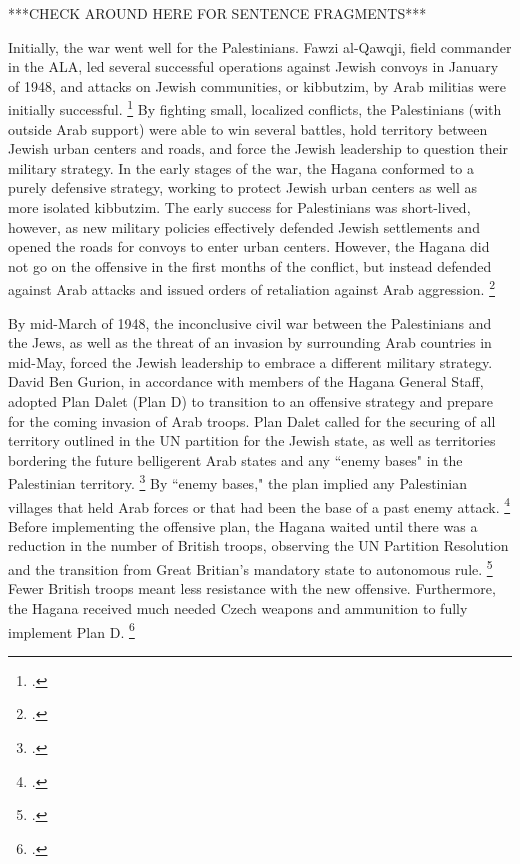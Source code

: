 \documentclass[12pt]{turabian-researchpaper}
\begin{document}
***CHECK AROUND HERE FOR SENTENCE FRAGMENTS***

Initially, the war went well for the Palestinians.  Fawzi al-Qawqji, field commander in the ALA, led several successful operations against Jewish convoys in January of 1948, and attacks on Jewish communities, or kibbutzim, by Arab militias were initially successful.
\footcite[][79]{pappe}
By fighting small, localized conflicts, the Palestinians (with outside Arab support) were able to win several battles, hold territory between Jewish urban centers and roads, and force the Jewish leadership to question their military strategy.  In the early stages of the war, the Hagana conformed to a purely defensive strategy, working to protect Jewish urban centers as well as more isolated kibbutzim.  The early success for Palestinians was short-lived, however, as new military policies effectively defended Jewish settlements and opened the roads for convoys to enter urban centers.  However, the Hagana did not go on the offensive in the first months of the conflict, but instead defended against Arab attacks and issued orders of retaliation against Arab aggression.
\footcite[][68]{tal}



By mid-March of 1948, the inconclusive civil war between the Palestinians and the Jews, as well as the threat of an invasion by surrounding Arab countries in mid-May, forced the Jewish leadership to embrace a different military strategy.  David Ben Gurion, in accordance with members of the Hagana General Staff, adopted Plan Dalet (Plan D) to transition to an offensive strategy and prepare for the coming invasion of Arab troops.  Plan Dalet called for the securing of all territory outlined in the UN partition for the Jewish state, as well as territories bordering the future belligerent Arab states and any ``enemy bases" in the Palestinian territory.
\footcite{khalidi}
By ``enemy bases," the plan implied any Palestinian villages that held Arab forces or that had been the base of a past enemy attack.
\footcite[][119]{morris}
Before implementing the offensive plan, the Hagana waited until there was a reduction in the number of British troops, observing the UN Partition Resolution and the transition from Great Britian's mandatory state to autonomous rule.
\footcite[][32]{herzog}
Fewer British troops meant less resistance with the new offensive.  Furthermore, the Hagana received much needed Czech weapons and ammunition to fully implement Plan D.
\footcite[][116]{morris}
\end{document}
